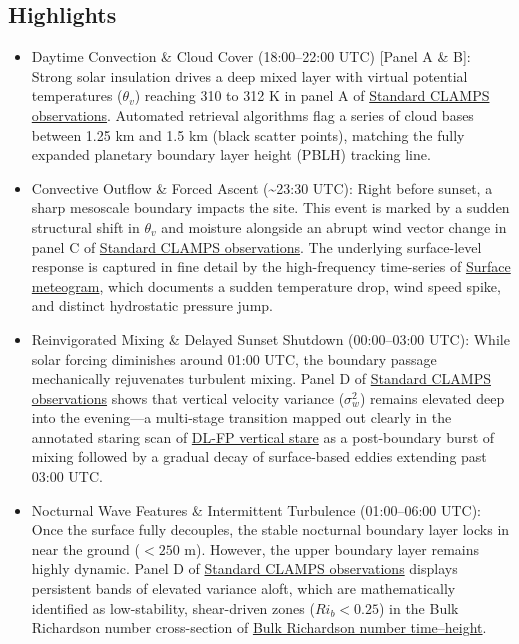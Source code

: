 \documentclass[11pt]{article}
\begin{document}
\subsection*{Highlights}
\begin{itemize}
  \item Daytime Convection \& Cloud Cover (18:00–22:00 UTC) [Panel A \& B]: Strong solar insulation drives a deep mixed layer with virtual potential temperatures ($\theta_v$) reaching 310 to 312 K in panel A of \hyperref[fig:diurnal_c2:diurnal_c2_instrument_template_4panel]{Standard CLAMPS observations}. Automated retrieval algorithms flag a series of cloud bases between 1.25 km and 1.5 km (black scatter points), matching the fully expanded planetary boundary layer height (PBLH) tracking line.
  \item Convective Outflow \& Forced Ascent (\textasciitilde{}23:30 UTC): Right before sunset, a sharp mesoscale boundary impacts the site. This event is marked by a sudden structural shift in $\theta_v$ and moisture alongside an abrupt wind vector change in panel C of \hyperref[fig:diurnal_c2:diurnal_c2_instrument_template_4panel]{Standard CLAMPS observations}. The underlying surface-level response is captured in fine detail by the high-frequency time-series of \hyperref[fig:diurnal_c2:diurnal_c2_aux_surface_meteogram]{Surface meteogram}, which documents a sudden temperature drop, wind speed spike, and distinct hydrostatic pressure jump.
  \item Reinvigorated Mixing \& Delayed Sunset Shutdown (00:00–03:00 UTC): While solar forcing diminishes around 01:00 UTC, the boundary passage mechanically rejuvenates turbulent mixing. Panel D of \hyperref[fig:diurnal_c2:diurnal_c2_instrument_template_4panel]{Standard CLAMPS observations} shows that vertical velocity variance ($\sigma_w^2$) remains elevated deep into the evening—a multi-stage transition mapped out clearly in the annotated staring scan of \hyperref[fig:diurnal_c2:diurnal_c2_clamps2stare]{DL-FP vertical stare} as a post-boundary burst of mixing followed by a gradual decay of surface-based eddies extending past 03:00 UTC.
  \item Nocturnal Wave Features \& Intermittent Turbulence (01:00–06:00 UTC): Once the surface fully decouples, the stable nocturnal boundary layer locks in near the ground ($<250\text{ m}$). However, the upper boundary layer remains highly dynamic. Panel D of \hyperref[fig:diurnal_c2:diurnal_c2_instrument_template_4panel]{Standard CLAMPS observations} displays persistent bands of elevated variance aloft, which are mathematically identified as low-stability, shear-driven zones ($Ri_b < 0.25$) in the Bulk Richardson number cross-section of \hyperref[fig:diurnal_c2:diurnal_c2_aux_rib_timeheight]{Bulk Richardson number time–height}.

\end{itemize}
\end{document}
